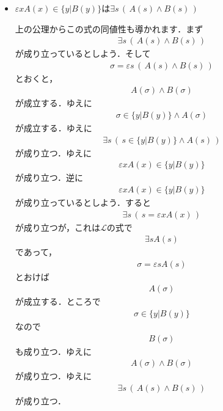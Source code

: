 \documentclass[a4j,10.5pt,oneside,openany]{jsbook}
\theoremstyle{mystyle}
\begin{document}
\begin{itemize}
		\item $\varepsilon x A(x) \in \{y|B(y)\}$は$\exists s\, \left(\, A(s) \wedge B(s)\, \right)$
			
			上の公理からこの式の同値性も導かれます．まず
			\begin{align}
				\exists s\, \left(\, A(s) \wedge B(s)\, \right)
			\end{align}
			が成り立っているとしよう．そして
			\begin{align}
				\sigma = \varepsilon s\, \left(\, A(s) \wedge B(s)\, \right)
			\end{align}
			とおくと，
			\begin{align}
				A(\sigma) \wedge B(\sigma)
			\end{align}
			が成立する．ゆえに
			\begin{align}
				\sigma \in \{y|B(y)\} \wedge A(\sigma)
			\end{align}
			が成立する．ゆえに
			\begin{align}
				\exists s\, \left(\, s \in \{y|B(y)\} \wedge A(s)\, \right)
			\end{align}
			が成り立つ．ゆえに
			\begin{align}
				\varepsilon x A(x) \in \{y|B(y)\}
			\end{align}
			が成り立つ．逆に
			\begin{align}
				\varepsilon x A(x) \in \{y|B(y)\}
			\end{align}
			が成り立っているとしよう．すると
			\begin{align}
				\exists s\, \left(\, s = \varepsilon x A(x)\, \right)
			\end{align}
			が成り立つが，これは$\mathcal{L}$の式で
			\begin{align}
				\exists s A(s)
			\end{align}
			であって，
			\begin{align}
				\sigma = \varepsilon s A(s)
			\end{align}
			とおけば
			\begin{align}
				A(\sigma)
			\end{align}
			が成立する．ところで
			\begin{align}
				\sigma \in \{y|B(y)\}
			\end{align}
			なので
			\begin{align}
				B(\sigma)
			\end{align}
			も成り立つ．ゆえに
			\begin{align}
				A(\sigma) \wedge B(\sigma)
			\end{align}
			が成り立つ．ゆえに
			\begin{align}
				\exists s\, \left(\, A(s) \wedge B(s)\, \right)
			\end{align}
			が成り立つ．
			

\end{itemize}
\end{document}
